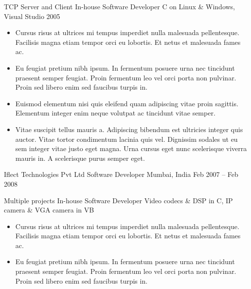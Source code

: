 \documentclass[10pt, a4paper]{cvhari}
\begin{document}
        \dividergray
        
        \project
            {TCP Server and Client}
            {In-house}
            {Software Developer}
            {C on Linux \& Windows, Visual Studio 2005}
    
            \begin{itemize}
                \item Cursus risus at ultrices mi tempus imperdiet nulla malesuada pellentesque. Facilisis magna etiam tempor orci eu lobortis. Et netus et malesuada fames ac.\smallskip
                
                \item Eu feugiat pretium nibh ipsum. In fermentum posuere urna nec tincidunt praesent semper feugiat. Proin fermentum leo vel orci porta non pulvinar. Proin sed libero enim sed faucibus turpis in. 
                
                \item Euismod elementum nisi quis eleifend quam adipiscing vitae proin sagittis. Elementum integer enim neque volutpat ac tincidunt vitae semper. 
                
                \item Vitae suscipit tellus mauris a. Adipiscing bibendum est ultricies integer quis auctor. Vitae tortor condimentum lacinia quis vel. Dignissim sodales ut eu sem integer vitae justo eget magna. Urna cursus eget nunc scelerisque viverra mauris in. A scelerisque purus semper eget. 
            \end{itemize}

\smallskip
\divider
\smallskip

    \company
        {Iflect Technologies Pvt Ltd}
        {Software Developer}
        {Mumbai, India}
        {Feb 2007 – Feb 2008}
        
        \project
            {Multiple projects}
            {In-house}
            {Software Developer}
            {Video codecs \& DSP in C, IP camera \& VGA camera in VB}
    
            \begin{itemize}
                \item Cursus risus at ultrices mi tempus imperdiet nulla malesuada pellentesque. Facilisis magna etiam tempor orci eu lobortis. Et netus et malesuada fames ac. \smallskip
                \item Eu feugiat pretium nibh ipsum. In fermentum posuere urna nec tincidunt praesent semper feugiat. Proin fermentum leo vel orci porta non pulvinar. Proin sed libero enim sed faucibus turpis in.\smallskip
            \end{itemize}
\end{document}
